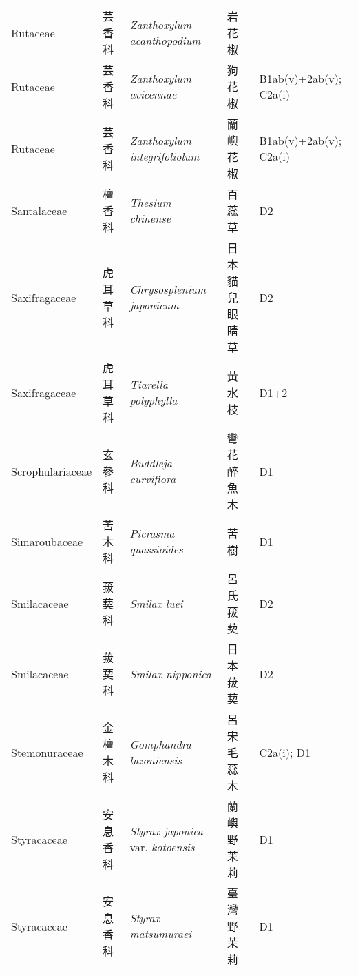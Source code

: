 {\begin{longtable}{p{2.5cm}p{2.5cm}p{4.5cm}p{2.5cm}p{3cm}}
    Rutaceae & 芸香科 & \textit{Zanthoxylum acanthopodium}  & 岩花椒 &  \index{Zanthoxylum@\textit{Zanthoxylum}!acanthopodium@\textit{acanthopodium}}  \index{岩花椒} \\
    Rutaceae & 芸香科 & \textit{Zanthoxylum avicennae}  & 狗花椒 & B1ab(v)+2ab(v); C2a(i) \index{Zanthoxylum@\textit{Zanthoxylum}!avicennae@\textit{avicennae}}  \index{狗花椒} \\
    Rutaceae & 芸香科 & \textit{Zanthoxylum integrifoliolum}  & 蘭嶼花椒 & B1ab(v)+2ab(v); C2a(i) \index{Zanthoxylum@\textit{Zanthoxylum}!integrifoliolum@\textit{integrifoliolum}}  \index{蘭嶼花椒} \\
    Santalaceae & 檀香科 & \textit{Thesium chinense}  & 百蕊草 & D2 \index{Thesium@\textit{Thesium}!chinense@\textit{chinense}}  \index{百蕊草} \\
    Saxifragaceae & 虎耳草科 & \textit{Chrysosplenium japonicum}  & 日本貓兒眼睛草 & D2 \index{Chrysosplenium@\textit{Chrysosplenium}!japonicum@\textit{japonicum}}  \index{日本貓兒眼睛草} \\
    Saxifragaceae & 虎耳草科 & \textit{Tiarella polyphylla}  & 黃水枝 & D1+2 \index{Tiarella@\textit{Tiarella}!polyphylla@\textit{polyphylla}}  \index{黃水枝} \\
    Scrophulariaceae & 玄參科 & \textit{Buddleja curviflora}  & 彎花醉魚木 & D1 \index{Buddleja@\textit{Buddleja}!curviflora@\textit{curviflora}}  \index{彎花醉魚木} \\
    Simaroubaceae & 苦木科 & \textit{Picrasma quassioides}  & 苦樹 & D1 \index{Picrasma@\textit{Picrasma}!quassioides@\textit{quassioides}}  \index{苦樹} \\
    Smilacaceae & 菝葜科 & \textit{Smilax luei}  & 呂氏菝葜 & D2 \index{Smilax@\textit{Smilax}!luei@\textit{luei}}  \index{呂氏菝葜} \\
    Smilacaceae & 菝葜科 & \textit{Smilax nipponica}  & 日本菝葜 & D2 \index{Smilax@\textit{Smilax}!nipponica@\textit{nipponica}}  \index{日本菝葜} \\
    Stemonuraceae & 金檀木科 & \textit{Gomphandra luzoniensis}  & 呂宋毛蕊木 & C2a(i); D1 \index{Gomphandra@\textit{Gomphandra}!luzoniensis@\textit{luzoniensis}}  \index{呂宋毛蕊木} \\
    Styracaceae & 安息香科 & \textit{Styrax japonica} var. \textit{kotoensis}  & 蘭嶼野茉莉 & D1 \index{Styrax@\textit{Styrax}!japonica@\textit{japonica}!var. kotoensis@var. \textit{kotoensis}}  \index{蘭嶼野茉莉} \\
    Styracaceae & 安息香科 & \textit{Styrax matsumuraei}  & 臺灣野茉莉 & D1 \index{Styrax@\textit{Styrax}!matsumuraei@\textit{matsumuraei}}  \index{臺灣野茉莉} \\

\end{longtable}}
